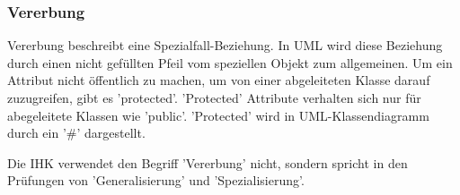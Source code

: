 \subsubsection{Vererbung}

Vererbung beschreibt eine Spezialfall-Beziehung. In UML wird diese Beziehung durch einen nicht gefüllten Pfeil vom speziellen Objekt zum allgemeinen. Um ein Attribut nicht öffentlich zu machen, um von einer abgeleiteten Klasse darauf zuzugreifen, gibt es 'protected'. 'Protected' Attribute verhalten sich nur für abegeleitete Klassen wie 'public'. 'Protected' wird in UML-Klassendiagramm durch ein '#' dargestellt.

Die IHK verwendet den Begriff 'Vererbung' nicht, sondern spricht in den Prüfungen von 'Generalisierung' und 'Spezialisierung'.